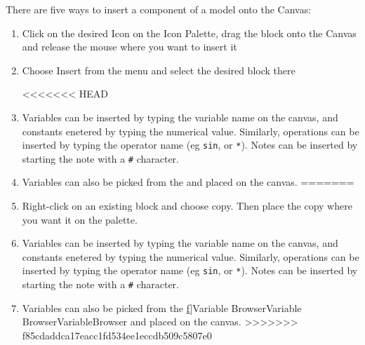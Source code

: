There are five ways to insert a component of a model onto the Canvas: 
\begin{enumerate}
\item Click on the desired Icon on the Icon Palette, drag the block onto
the Canvas and release the mouse where you want to insert it
\begin{center}
\par\end{center}
\item Choose Insert from the menu and select the desired block there


\begin{center}
 
\par\end{center}

<<<<<<< HEAD
\item Variables can be inserted by typing the variable name on the
  canvas, and constants enetered by typing the numerical
  value. Similarly, operations can be inserted by typing the operator
  name (eg \verb+sin+, or \verb+*+). Notes can be inserted by starting
  the note with a \verb+#+ character.

\item Variables can also be picked from the  and placed on the canvas.
=======
\newpage{}
\item Right-click on an existing block and choose copy. Then place the copy
where you want it on the palette.
\begin{center}
\par\end{center}
\item Variables can be inserted by typing the variable name on the canvas,
and constants enetered by typing the numerical value. Similarly, operations
can be inserted by typing the operator name (eg \verb+sin+, or \verb+*+).
Notes can be inserted by starting the note with a \verb+#+ character.
\item Variables can also be picked from the \hyperref{[}{r}{e}f{]}{Variable
Browser}{Variable Browser}{}{VariableBrowser} and placed on
the canvas. 
>>>>>>> f85cdaddca17eacc1fd534ee1eccdb509c5807e0
\end{enumerate}

